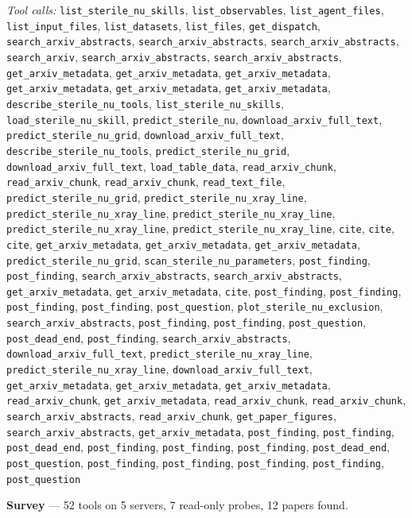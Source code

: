 \documentclass[11pt,a4paper]{article}
\begin{document}
\textit{Tool calls:} \texttt{list\_sterile\_nu\_skills}, \texttt{list\_observables}, \texttt{list\_agent\_files}, \texttt{list\_input\_files}, \texttt{list\_datasets}, \texttt{list\_files}, \texttt{get\_dispatch}, \texttt{search\_arxiv\_abstracts}, \texttt{search\_arxiv\_abstracts}, \texttt{search\_arxiv\_abstracts}, \texttt{search\_arxiv}, \texttt{search\_arxiv\_abstracts}, \texttt{search\_arxiv\_abstracts}, \texttt{get\_arxiv\_metadata}, \texttt{get\_arxiv\_metadata}, \texttt{get\_arxiv\_metadata}, \texttt{get\_arxiv\_metadata}, \texttt{get\_arxiv\_metadata}, \texttt{get\_arxiv\_metadata}, \texttt{describe\_sterile\_nu\_tools}, \texttt{list\_sterile\_nu\_skills}, \texttt{load\_sterile\_nu\_skill}, \texttt{predict\_sterile\_nu}, \texttt{download\_arxiv\_full\_text}, \texttt{predict\_sterile\_nu\_grid}, \texttt{download\_arxiv\_full\_text}, \texttt{describe\_sterile\_nu\_tools}, \texttt{predict\_sterile\_nu\_grid}, \texttt{download\_arxiv\_full\_text}, \texttt{load\_table\_data}, \texttt{read\_arxiv\_chunk}, \texttt{read\_arxiv\_chunk}, \texttt{read\_arxiv\_chunk}, \texttt{read\_text\_file}, \texttt{predict\_sterile\_nu\_grid}, \texttt{predict\_sterile\_nu\_xray\_line}, \texttt{predict\_sterile\_nu\_xray\_line}, \texttt{predict\_sterile\_nu\_xray\_line}, \texttt{predict\_sterile\_nu\_xray\_line}, \texttt{predict\_sterile\_nu\_xray\_line}, \texttt{cite}, \texttt{cite}, \texttt{cite}, \texttt{get\_arxiv\_metadata}, \texttt{get\_arxiv\_metadata}, \texttt{get\_arxiv\_metadata}, \texttt{predict\_sterile\_nu\_grid}, \texttt{scan\_sterile\_nu\_parameters}, \texttt{post\_finding}, \texttt{post\_finding}, \texttt{search\_arxiv\_abstracts}, \texttt{search\_arxiv\_abstracts}, \texttt{get\_arxiv\_metadata}, \texttt{get\_arxiv\_metadata}, \texttt{cite}, \texttt{post\_finding}, \texttt{post\_finding}, \texttt{post\_finding}, \texttt{post\_finding}, \texttt{post\_question}, \texttt{plot\_sterile\_nu\_exclusion}, \texttt{search\_arxiv\_abstracts}, \texttt{post\_finding}, \texttt{post\_finding}, \texttt{post\_question}, \texttt{post\_dead\_end}, \texttt{post\_finding}, \texttt{search\_arxiv\_abstracts}, \texttt{download\_arxiv\_full\_text}, \texttt{predict\_sterile\_nu\_xray\_line}, \texttt{predict\_sterile\_nu\_xray\_line}, \texttt{download\_arxiv\_full\_text}, \texttt{get\_arxiv\_metadata}, \texttt{get\_arxiv\_metadata}, \texttt{get\_arxiv\_metadata}, \texttt{read\_arxiv\_chunk}, \texttt{get\_arxiv\_metadata}, \texttt{read\_arxiv\_chunk}, \texttt{read\_arxiv\_chunk}, \texttt{search\_arxiv\_abstracts}, \texttt{read\_arxiv\_chunk}, \texttt{get\_paper\_figures}, \texttt{search\_arxiv\_abstracts}, \texttt{get\_arxiv\_metadata}, \texttt{post\_finding}, \texttt{post\_finding}, \texttt{post\_dead\_end}, \texttt{post\_finding}, \texttt{post\_finding}, \texttt{post\_finding}, \texttt{post\_dead\_end}, \texttt{post\_question}, \texttt{post\_finding}, \texttt{post\_finding}, \texttt{post\_finding}, \texttt{post\_finding}, \texttt{post\_question}\par
\textbf{Survey} --- 52 tools on 5 servers, 7 read-only probes, 12 papers found.
\end{document}
